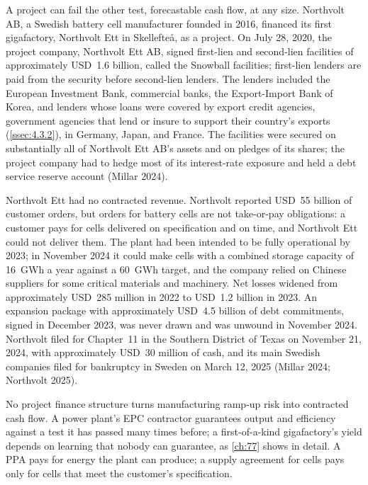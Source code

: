 A project can fail the other test, forecastable cash flow, at any size. Northvolt AB, a Swedish battery cell manufacturer founded in 2016, financed its first gigafactory, Northvolt Ett in Skellefteå, as a project. On July 28, 2020, the project company, Northvolt Ett AB, signed first-lien and second-lien facilities of approximately USD~1.6 billion, called the Snowball facilities; first-lien lenders are paid from the security before second-lien lenders. The lenders included the European Investment Bank, commercial banks, the Export-Import Bank of Korea, and lenders whose loans were covered by export credit agencies, government agencies that lend or insure to support their country's exports (\cref{ssec:4.3.2}), in Germany, Japan, and France. The facilities were secured on substantially all of Northvolt Ett AB's assets and on pledges of its shares; the project company had to hedge most of its interest-rate exposure and held a debt service reserve account (Millar 2024).

Northvolt Ett had no contracted revenue. Northvolt reported USD~55 billion of customer orders, but orders for battery cells are not take-or-pay obligations: a customer pays for cells delivered on specification and on time, and Northvolt Ett could not deliver them. The plant had been intended to be fully operational by 2023; in November 2024 it could make cells with a combined storage capacity of 16~GWh a year against a 60~GWh target, and the company relied on Chinese suppliers for some critical materials and machinery. Net losses widened from approximately USD~285 million in 2022 to USD~1.2 billion in 2023. An expansion package with approximately USD~4.5 billion of debt commitments, signed in December 2023, was never drawn and was unwound in November 2024. Northvolt filed for Chapter~11 in the Southern District of Texas on November 21, 2024, with approximately USD~30 million of cash, and its main Swedish companies filed for bankruptcy in Sweden on March 12, 2025 (Millar 2024; Northvolt 2025).

No project finance structure turns manufacturing ramp-up risk into contracted cash flow. A power plant's EPC contractor guarantees output and efficiency against a test it has passed many times before; a first-of-a-kind gigafactory's yield depends on learning that nobody can guarantee, as \cref{ch:77} shows in detail. A PPA pays for energy the plant can produce; a supply agreement for cells pays only for cells that meet the customer's specification.

